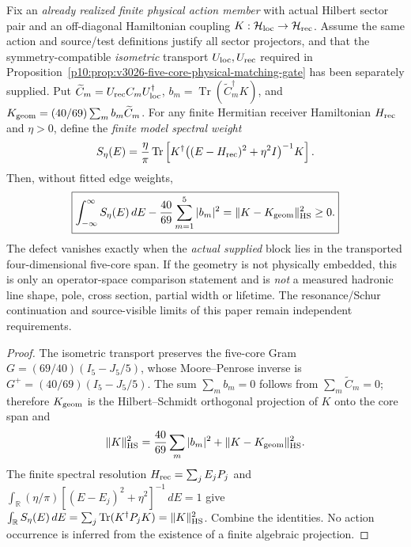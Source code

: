 \documentclass[12pt,a4paper]{article}
\begin{document}
\begin{theorem}
\label{p11:thm:v3026-five-core-spectral-budget}
Fix an \emph{already realized finite physical action member} with
actual Hilbert sector pair and an off-diagonal Hamiltonian coupling
$K:\mathcal H_{\rm loc}\to\mathcal H_{\rm rec}$.
Assume the same action and source/test definitions justify all sector
projectors, and that the symmetry-compatible \emph{isometric}
transport $U_{\rm loc},U_{\rm rec}$ required in
Proposition~\ref{p10:prop:v3026-five-core-physical-matching-gate}
has been separately supplied. Put
$\widetilde C_m=U_{\rm rec}C_mU_{\rm loc}^\dagger$,
$b_m=\operatorname{Tr}(\widetilde C_m^\dagger K)$, and
$K_{\rm geom}=(40/69)\sum_m b_m\widetilde C_m$.
For any finite Hermitian receiver Hamiltonian $H_{\rm rec}$ and
$\eta>0$, define the \emph{finite model spectral weight}
\[
S_\eta(E)={\eta\over\pi}\operatorname{Tr}
 \left[K^\dagger\big((E-H_{\rm rec})^2+\eta^2 I\big)^{-1}K\right].
\]
Then, without fitted edge weights,
\[
\boxed{\int_{-\infty}^{\infty}S_\eta(E)\,dE
 -{40\over69}\sum_{m=1}^5|b_m|^2
 =\|K-K_{\rm geom}\|_{\rm HS}^2\ge0.}
\]
The defect vanishes exactly when the \emph{actual supplied} block
lies in the transported four-dimensional five-core span.
If the geometry is not physically embedded, this is only an
operator-space comparison statement and is \emph{not} a measured
hadronic line shape, pole, cross section, partial width or lifetime.
The resonance/Schur continuation and source-visible limits of this
paper remain independent requirements.
\end{theorem}
\begin{proof}
The isometric transport preserves the five-core Gram
$G=(69/40)(I_5-J_5/5)$, whose Moore--Penrose inverse is
$G^+=(40/69)(I_5-J_5/5)$. The sum $\sum_m b_m=0$ follows
from $\sum_m\widetilde C_m=0$; therefore $K_{\rm geom}$ is the
Hilbert--Schmidt orthogonal projection of $K$ onto the core span and
\[
\|K\|_{\rm HS}^2={40\over69}\sum_m|b_m|^2
 +\|K-K_{\rm geom}\|_{\rm HS}^2.
\]
The finite spectral resolution $H_{\rm rec}=\sum_jE_jP_j$ and
$\int_{\mathbb R}(\eta/\pi)[(E-E_j)^2+\eta^2]^{-1}
\,dE=1$ give
$\int_{\mathbb R}S_\eta(E)\,dE=\sum_j
\operatorname{Tr}(K^\dagger P_jK)=\|K\|_{\rm HS}^2$.
Combine the identities. No action occurrence is inferred from the
existence of a finite algebraic projection.
\end{proof}
\end{document}

